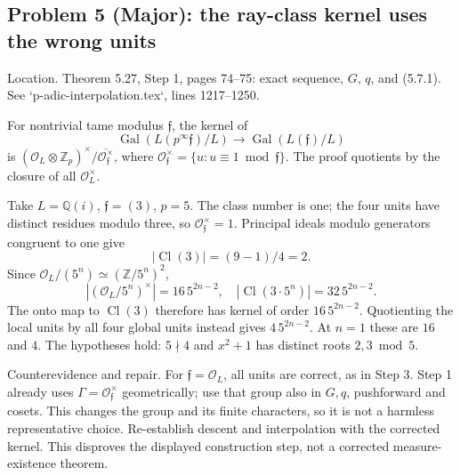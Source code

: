 \documentclass[10pt]{article}
\begin{document}
\subsection*{Problem 5 (Major): the ray-class kernel uses the wrong units}
Location. Theorem 5.27, Step 1, pages 74–75: exact sequence, \(G\), \(q\), and (5.7.1). See `p-adic-interpolation.tex`, lines 1217–1250.\par
For nontrivial tame modulus \(\mathfrak f\), the kernel of \[\operatorname{Gal}(L(p^\infty\mathfrak f)/L)\longrightarrow\operatorname{Gal}(L(\mathfrak f)/L)\] is \((\mathcal O_L\otimes\mathbb Z_p)^\times/\overline{\mathcal O_{\mathfrak f}^\times}\), where \(\mathcal O_{\mathfrak f}^\times=\{u:u\equiv1\bmod\mathfrak f\}\). The proof quotients by the closure of all \(\mathcal O_L^\times\).\par
Take \(L=\mathbb Q(i)\), \(\mathfrak f=(3)\), \(p=5\). The class number is one; the four units have distinct residues modulo three, so \(\mathcal O_{\mathfrak f}^\times=1\). Principal ideals modulo generators congruent to one give \[|\operatorname{Cl}(3)|=(9-1)/4=2.\] Since \(\mathcal O_L/(5^n)\simeq(\mathbb Z/5^n)^2\), \[|(\mathcal O_L/5^n)^\times|=16\,5^{2n-2},\quad
 |\operatorname{Cl}(3\cdot5^n)|=32\,5^{2n-2}.\] The onto map to \(\operatorname{Cl}(3)\) therefore has kernel of order \(16\,5^{2n-2}\). Quotienting the local units by all four global units instead gives \(4\,5^{2n-2}\). At \(n=1\) these are \(16\) and \(4\). The hypotheses hold: \(5\nmid4\) and \(x^2+1\) has distinct roots \(2,3\bmod5\).\par
Counterevidence and repair. For \(\mathfrak f=\mathcal O_L\), all units are correct, as in Step 3. Step 1 already uses \(\Gamma=\mathcal O_{\mathfrak f}^\times\) geometrically; use that group also in \(G,q\), pushforward and cosets. This changes the group and its finite characters, so it is not a harmless representative choice. Re-establish descent and interpolation with the corrected kernel. This disproves the displayed construction step, not a corrected measure-existence theorem.\par
\end{document}
